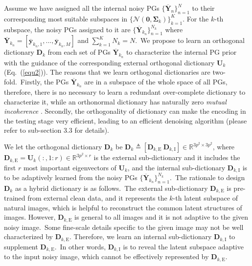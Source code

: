 \documentclass[10pt,twocolumn,letterpaper]{article}
\begin{document}
Assume we have assigned all the internal noisy PGs $\{\mathbf{\overline{Y}}_{n}\}_{n=1}^{N}$ to their corresponding most suitable subspaces in $\{\mathcal{N}(\mathbf{0},\mathbf{\Sigma}_{k})\}_{k=1}^{K}$. For the $k$-th subspace, the noisy PGs assigned to it are $\{\mathbf{\overline{Y}}_{k_{n}}\}_{n=1}^{N_{k}}$ where $\mathbf{\overline{Y}}_{k_{n}}=[\mathbf{\overline{y}}_{k_{n},1},...,\mathbf{\overline{y}}_{k_{n},M}]$ and $\sum_{k=1}^{K}N_{k}=N$.\ We propose to learn an orthogonal dictionary $\mathbf{D}_{k}$ from each set of PGs $\mathbf{\overline{Y}}_{k_{n}}$ to characterize the internal PG prior with the guidance of the corresponding external orthogonal dictionary $\mathbf{U}_{k}$ (Eq.\ (\ref{equ2})). The reasons that we learn orthogonal dictionaries are two-fold.\ Firstly, the PGs $\mathbf{\overline{Y}}_{k_{n}}$ are in a subspace of the whole space of all PGs, therefore, there is no necessary to learn a redundant over-complete dictionary to characterize it, while an orthonormal dictionary has naturally zero \emph{mutual incoherence} \cite{donoho2001uncertainty}. Secondly, the orthogonality of dictionary can make the encoding in the testing stage very efficient, leading to an efficient denoising algorithm (please refer to sub-section 3.3 for details).

We let the orthogonal dictionary $\mathbf{D}_{k}$ be $\mathbf{D}_{k}\triangleq[\mathbf{D}_{k,\text{E}}\ \mathbf{D}_{k,\text{I}}]\in \mathbb{R}^{3p^2\times 3p^2}$, where $\mathbf{D}_{k,\text{E}}=\mathbf{U}_{k}(:,1:r)\in\mathbb{R}^{3p^2\times r}$ is the external sub-dictionary and it includes the first $r$ most important eigenvectors of $\mathbf{U}_{k}$, and the internal sub-dictionary $\mathbf{D}_{k,\text{I}}$ is to be adaptively learned from the noisy PGs $\{\mathbf{\overline{Y}}_{k_{n}}\}_{n=1}^{N_{k}}$.\ The rationale to design $\mathbf{D}_{k}$ as a hybrid dictionary is as follows.\ The external sub-dictionary $\mathbf{D}_{k,\text{E}}$ is pre-trained from external clean data, and it represents the $k$-th latent subspace of natural images, which is helpful to reconstruct the common latent structures of images. However, $\mathbf{D}_{k,\text{E}}$ is general to all images and it is not adaptive to the given noisy image.\ Some fine-scale details specific to the given image may not be well characterized by $\mathbf{D}_{k,\text{E}}$. Therefore, we learn an internal sub-dictionary $\mathbf{D}_{k,\text{I}}$ to supplement $\mathbf{D}_{k,\text{E}}$.\ In other words, $\mathbf{D}_{k,\text{I}}$ is to reveal the latent subspace adaptive to the input noisy image, which cannot be effectively represented by $\mathbf{D}_{k,\text{E}}$. 
\end{document}
